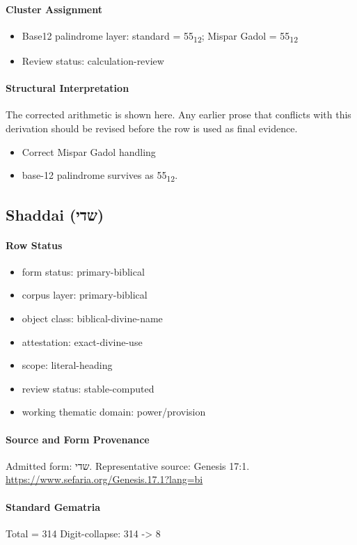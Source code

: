 \paragraph{Cluster Assignment}
\begin{itemize}
\item Base12 palindrome layer: standard = 55\textsubscript{12}; Mispar Gadol = 55\textsubscript{12}
\item Review status: calculation-review
\end{itemize}
\paragraph{Structural Interpretation}
The corrected arithmetic is shown here. Any earlier prose that conflicts with this derivation should be revised before the row is used as final evidence.

\begin{itemize}
\item Correct Mispar Gadol handling
\item base-12 palindrome survives as 55\textsubscript{12}.
\end{itemize}

\subsection{Shaddai (שדי)}
\paragraph{Row Status}
\begin{itemize}
\item form status: primary-biblical
\item corpus layer: primary-biblical
\item object class: biblical-divine-name
\item attestation: exact-divine-use
\item scope: literal-heading
\item review status: stable-computed
\item working thematic domain: power/provision
\end{itemize}
\paragraph{Source and Form Provenance}
Admitted form: שדי.
Representative source: Genesis 17:1.
\url{https://www.sefaria.org/Genesis.17.1?lang=bi}
\paragraph{Standard Gematria}
Total = 314
Digit-collapse: 314 -> 8
